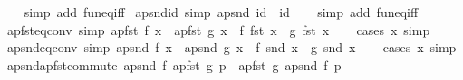 \begin{isabellebody}
%
\isadelimproof
\ \ %
\endisadelimproof
%
\isatagproof
{}\isamarkupfalse%
\ {\isacharparenleft}{\kern0pt}simp\ add{\isacharcolon}{\kern0pt}\ fun{\isacharunderscore}{\kern0pt}eq{\isacharunderscore}{\kern0pt}iff{\isacharparenright}{\kern0pt}%
\endisatagproof
{\isafoldproof}%
%
\isadelimproof
\isanewline
%
\endisadelimproof
\isanewline
{}\isamarkupfalse%
\ apsnd{\isacharunderscore}{\kern0pt}id\ {\isacharbrackleft}{\kern0pt}simp{\isacharbrackright}{\kern0pt}{\isacharcolon}{\kern0pt}\ {\isachardoublequoteopen}apsnd\ id\ {\isacharequal}{\kern0pt}\ id{\isachardoublequoteclose}\isanewline
%
\isadelimproof
\ \ %
\endisadelimproof
%
\isatagproof
{}\isamarkupfalse%
\ {\isacharparenleft}{\kern0pt}simp\ add{\isacharcolon}{\kern0pt}\ fun{\isacharunderscore}{\kern0pt}eq{\isacharunderscore}{\kern0pt}iff{\isacharparenright}{\kern0pt}%
\endisatagproof
{\isafoldproof}%
%
\isadelimproof
\isanewline
%
\endisadelimproof
\isanewline
{}\isamarkupfalse%
\ apfst{\isacharunderscore}{\kern0pt}eq{\isacharunderscore}{\kern0pt}conv\ {\isacharbrackleft}{\kern0pt}simp{\isacharbrackright}{\kern0pt}{\isacharcolon}{\kern0pt}\ {\isachardoublequoteopen}apfst\ f\ x\ {\isacharequal}{\kern0pt}\ apfst\ g\ x\ {\isasymlongleftrightarrow}\ f\ {\isacharparenleft}{\kern0pt}fst\ x{\isacharparenright}{\kern0pt}\ {\isacharequal}{\kern0pt}\ g\ {\isacharparenleft}{\kern0pt}fst\ x{\isacharparenright}{\kern0pt}{\isachardoublequoteclose}\isanewline
%
\isadelimproof
\ \ %
\endisadelimproof
%
\isatagproof
{}\isamarkupfalse%
\ {\isacharparenleft}{\kern0pt}cases\ x{\isacharparenright}{\kern0pt}\ simp%
\endisatagproof
{\isafoldproof}%
%
\isadelimproof
\isanewline
%
\endisadelimproof
\isanewline
{}\isamarkupfalse%
\ apsnd{\isacharunderscore}{\kern0pt}eq{\isacharunderscore}{\kern0pt}conv\ {\isacharbrackleft}{\kern0pt}simp{\isacharbrackright}{\kern0pt}{\isacharcolon}{\kern0pt}\ {\isachardoublequoteopen}apsnd\ f\ x\ {\isacharequal}{\kern0pt}\ apsnd\ g\ x\ {\isasymlongleftrightarrow}\ f\ {\isacharparenleft}{\kern0pt}snd\ x{\isacharparenright}{\kern0pt}\ {\isacharequal}{\kern0pt}\ g\ {\isacharparenleft}{\kern0pt}snd\ x{\isacharparenright}{\kern0pt}{\isachardoublequoteclose}\isanewline
%
\isadelimproof
\ \ %
\endisadelimproof
%
\isatagproof
{}\isamarkupfalse%
\ {\isacharparenleft}{\kern0pt}cases\ x{\isacharparenright}{\kern0pt}\ simp%
\endisatagproof
{\isafoldproof}%
%
\isadelimproof
\isanewline
%
\endisadelimproof
\isanewline
{}\isamarkupfalse%
\ apsnd{\isacharunderscore}{\kern0pt}apfst{\isacharunderscore}{\kern0pt}commute{\isacharcolon}{\kern0pt}\ {\isachardoublequoteopen}apsnd\ f\ {\isacharparenleft}{\kern0pt}apfst\ g\ p{\isacharparenright}{\kern0pt}\ {\isacharequal}{\kern0pt}\ apfst\ g\ {\isacharparenleft}{\kern0pt}apsnd\ f\ p{\isacharparenright}{\kern0pt}{\isachardoublequoteclose}\isanewline

\end{isabellebody}
